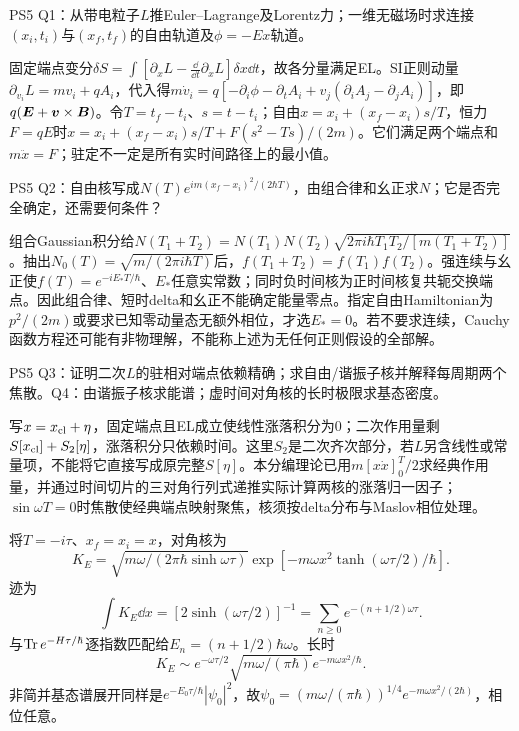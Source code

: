 \begin{exercise}
PS5 Q1：从带电粒子$L$推Euler--Lagrange及Lorentz力；一维无磁场时求连接$(x_i,t_i)$与$(x_f,t_f)$的自由轨道及$\phi=-Ex$轨道。
\end{exercise}
\begin{solution}
固定端点变分$\delta S=\int[\partial_xL-\frac{\dd}{\dd t}\partial_{\dot x}L]\delta x\dd t$，故各分量满足EL。SI正则动量$\partial_{v_i}L=mv_i+qA_i$，代入得$m\dot v_i=q[-\partial_i\phi-\partial_tA_i+v_j(\partial_iA_j-\partial_jA_i)]$，即$q(\boldsymbol{E}+\boldsymbol{v}\times\boldsymbol{B})$。令$T=t_f-t_i$、$s=t-t_i$；自由$x=x_i+(x_f-x_i)s/T$，恒力$F=qE$时$x=x_i+(x_f-x_i)s/T+F(s^2-Ts)/(2m)$。它们满足两个端点和$m\ddot x=F$；驻定不一定是所有实时间路径上的最小值。
\end{solution}
\begin{exercise}
PS5 Q2：自由核写成$N(T)e^{im(x_f-x_i)^2/(2\hbar T)}$，由组合律和幺正求$N$；它是否完全确定，还需要何条件？
\end{exercise}
\begin{solution}
组合Gaussian积分给$N(T_1+T_2)=N(T_1)N(T_2)\sqrt{2\pi i\hbar T_1T_2/[m(T_1+T_2)]}$。抽出$N_0(T)=\sqrt{m/(2\pi i\hbar T)}$后，$f(T_1+T_2)=f(T_1)f(T_2)$。强连续与幺正使$f(T)=e^{-iE_*T/\hbar}$、$E_*$任意实常数；同时负时间核为正时间核复共轭交换端点。因此组合律、短时delta和幺正不能确定能量零点。指定自由Hamiltonian为$p^2/(2m)$或要求已知零动量态无额外相位，才选$E_*=0$。若不要求连续，Cauchy函数方程还可能有非物理解，不能称上述为无任何正则假设的全部解。
\end{solution}
\begin{exercise}
PS5 Q3：证明二次$L$的驻相对端点依赖精确；求自由/谐振子核并解释每周期两个焦散。Q4：由谐振子核求能谱；虚时间对角核的长时极限求基态密度。
\end{exercise}
\begin{solution}
写$x=x_{\rm cl}+\eta$，固定端点且EL成立使线性涨落积分为0；二次作用量剩$S[x_{\rm cl}]+S_2[\eta]$，涨落积分只依赖时间。这里$S_2$是二次齐次部分，若$L$另含线性或常量项，不能将它直接写成原完整$S[\eta]$。本分编理论已用$m[x\dot x]_0^T/2$求经典作用量，并通过时间切片的三对角行列式递推实际计算两核的涨落归一因子；$\sin\omega T=0$时焦散使经典端点映射聚焦，核须按delta分布与Maslov相位处理。

将$T=-i\tau$、$x_f=x_i=x$，对角核为
\[K_E=\sqrt{m\omega/(2\pi\hbar\sinh\omega\tau)}\exp[-m\omega x^2\tanh(\omega\tau/2)/\hbar].\]
迹为
\[\int K_E\dd x=[2\sinh(\omega\tau/2)]^{-1}=\sum_{n\ge0}e^{-(n+1/2)\omega\tau}.\]
与$\operatorname{Tr} e^{-H\tau/\hbar}$逐指数匹配给$E_n=(n+1/2)\hbar\omega$。长时
\[K_E\sim e^{-\omega\tau/2}\sqrt{m\omega/(\pi\hbar)}e^{-m\omega x^2/\hbar}.\]
非简并基态谱展开同样是$e^{-E_0\tau/\hbar}|\psi_0|^2$，故$\psi_0=(m\omega/(\pi\hbar))^{1/4}e^{-m\omega x^2/(2\hbar)}$，相位任意。
\end{solution}

